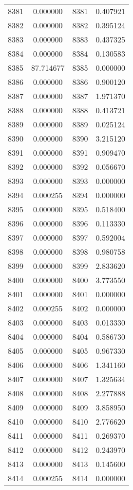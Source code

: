 \documentclass[12pt]{article}
\begin{document}
\begin{longtable}{@{}cccc@{}}
8381 & 0.000000 & 8381 & 0.407921 \\
8382 & 0.000000 & 8382 & 0.395124 \\
8383 & 0.000000 & 8383 & 0.437325 \\
8384 & 0.000000 & 8384 & 0.130583 \\
8385 & 87.714677 & 8385 & 0.000000 \\
8386 & 0.000000 & 8386 & 0.900120 \\
8387 & 0.000000 & 8387 & 1.971370 \\
8388 & 0.000000 & 8388 & 0.413721 \\
8389 & 0.000000 & 8389 & 0.025124 \\
8390 & 0.000000 & 8390 & 3.215120 \\
8391 & 0.000000 & 8391 & 0.909470 \\
8392 & 0.000000 & 8392 & 0.056670 \\
8393 & 0.000000 & 8393 & 0.000000 \\
8394 & 0.000255 & 8394 & 0.000000 \\
8395 & 0.000000 & 8395 & 0.518400 \\
8396 & 0.000000 & 8396 & 0.113330 \\
8397 & 0.000000 & 8397 & 0.592004 \\
8398 & 0.000000 & 8398 & 0.980758 \\
8399 & 0.000000 & 8399 & 2.833620 \\
8400 & 0.000000 & 8400 & 3.773550 \\
8401 & 0.000000 & 8401 & 0.000000 \\
8402 & 0.000255 & 8402 & 0.000000 \\
8403 & 0.000000 & 8403 & 0.013330 \\
8404 & 0.000000 & 8404 & 0.586730 \\
8405 & 0.000000 & 8405 & 0.967330 \\
8406 & 0.000000 & 8406 & 1.341160 \\
8407 & 0.000000 & 8407 & 1.325634 \\
8408 & 0.000000 & 8408 & 2.277888 \\
8409 & 0.000000 & 8409 & 3.858950 \\
8410 & 0.000000 & 8410 & 2.776620 \\
8411 & 0.000000 & 8411 & 0.269370 \\
8412 & 0.000000 & 8412 & 0.243970 \\
8413 & 0.000000 & 8413 & 0.145600 \\
8414 & 0.000255 & 8414 & 0.000000 \\

\end{longtable}
\end{document}
